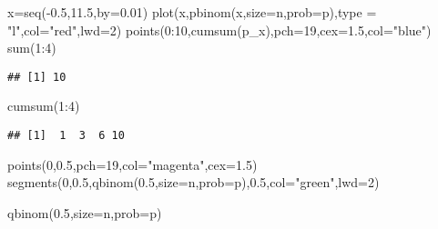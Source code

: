 \documentclass[
]{article}
\newenvironment{Shaded}{\begin{snugshade}}{\end{snugshade}}
\newcommand{\AttributeTok}[1]{\textcolor[rgb]{0.77,0.63,0.00}{#1}}
\newcommand{\DecValTok}[1]{\textcolor[rgb]{0.00,0.00,0.81}{#1}}
\newcommand{\FloatTok}[1]{\textcolor[rgb]{0.00,0.00,0.81}{#1}}
\newcommand{\FunctionTok}[1]{\textcolor[rgb]{0.00,0.00,0.00}{#1}}
\newcommand{\NormalTok}[1]{#1}
\newcommand{\OtherTok}[1]{\textcolor[rgb]{0.56,0.35,0.01}{#1}}
\newcommand{\SpecialCharTok}[1]{\textcolor[rgb]{0.00,0.00,0.00}{#1}}
\newcommand{\StringTok}[1]{\textcolor[rgb]{0.31,0.60,0.02}{#1}}
\begin{document}
\begin{Shaded}
\begin{Highlighting}[]
\NormalTok{x}\OtherTok{=}\FunctionTok{seq}\NormalTok{(}\SpecialCharTok{{-}}\FloatTok{0.5}\NormalTok{,}\FloatTok{11.5}\NormalTok{,}\AttributeTok{by=}\FloatTok{0.01}\NormalTok{)}
\FunctionTok{plot}\NormalTok{(x,}\FunctionTok{pbinom}\NormalTok{(x,}\AttributeTok{size=}\NormalTok{n,}\AttributeTok{prob=}\NormalTok{p),}\AttributeTok{type =} \StringTok{"l"}\NormalTok{,}\AttributeTok{col=}\StringTok{"red"}\NormalTok{,}\AttributeTok{lwd=}\DecValTok{2}\NormalTok{)}
\FunctionTok{points}\NormalTok{(}\DecValTok{0}\SpecialCharTok{:}\DecValTok{10}\NormalTok{,}\FunctionTok{cumsum}\NormalTok{(p\_x),}\AttributeTok{pch=}\DecValTok{19}\NormalTok{,}\AttributeTok{cex=}\FloatTok{1.5}\NormalTok{,}\AttributeTok{col=}\StringTok{"blue"}\NormalTok{)}
\FunctionTok{sum}\NormalTok{(}\DecValTok{1}\SpecialCharTok{:}\DecValTok{4}\NormalTok{)}
\end{Highlighting}
\end{Shaded}

\begin{verbatim}
## [1] 10
\end{verbatim}

\begin{Shaded}
\begin{Highlighting}[]
\FunctionTok{cumsum}\NormalTok{(}\DecValTok{1}\SpecialCharTok{:}\DecValTok{4}\NormalTok{)}
\end{Highlighting}
\end{Shaded}

\begin{verbatim}
## [1]  1  3  6 10
\end{verbatim}

\begin{Shaded}
\begin{Highlighting}[]
\FunctionTok{points}\NormalTok{(}\DecValTok{0}\NormalTok{,}\FloatTok{0.5}\NormalTok{,}\AttributeTok{pch=}\DecValTok{19}\NormalTok{,}\AttributeTok{col=}\StringTok{"magenta"}\NormalTok{,}\AttributeTok{cex=}\FloatTok{1.5}\NormalTok{)}
\FunctionTok{segments}\NormalTok{(}\DecValTok{0}\NormalTok{,}\FloatTok{0.5}\NormalTok{,}\FunctionTok{qbinom}\NormalTok{(}\FloatTok{0.5}\NormalTok{,}\AttributeTok{size=}\NormalTok{n,}\AttributeTok{prob=}\NormalTok{p),}\FloatTok{0.5}\NormalTok{,}\AttributeTok{col=}\StringTok{"green"}\NormalTok{,}\AttributeTok{lwd=}\DecValTok{2}\NormalTok{)}


\FunctionTok{qbinom}\NormalTok{(}\FloatTok{0.5}\NormalTok{,}\AttributeTok{size=}\NormalTok{n,}\AttributeTok{prob=}\NormalTok{p)}
\end{Highlighting}
\end{Shaded}
\end{document}
